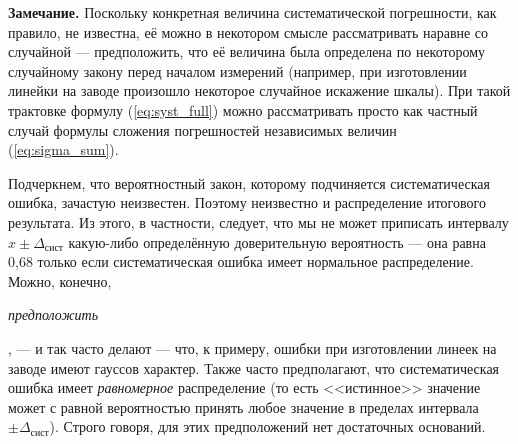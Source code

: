 \documentclass[10pt]{article}
\begin{document}
{\footnotesize
\textbf{Замечание.} Поскольку конкретная
величина систематической погрешности, как правило, не известна, её
можно в некотором смысле рассматривать наравне со случайной ---
предположить, что её величина была определена по некоторому случайному
закону перед началом измерений (например, при изготовлении линейки
на заводе произошло некоторое случайное искажение шкалы). При такой
трактовке формулу (\ref{eq:syst_full}) можно рассматривать просто
как частный случай формулы сложения погрешностей независимых величин
(\ref{eq:sigma_sum}).\par

Подчеркнем, что вероятностный закон, которому подчиняется
систематическая ошибка, зачастую неизвестен. Поэтому неизвестно и
распределение итогового результата. Из этого, в частности, следует,
что мы не может приписать интервалу $x\pm\Delta_{\text{сист}}$ какую-либо
определённую доверительную вероятность --- она равна 0,68
только если систематическая ошибка имеет нормальное распределение.
Можно, конечно, }\emph{\footnotesize{}предположить}{\footnotesize{},
--- и так часто делают --- что, к примеру, ошибки
при изготовлении линеек на заводе имеют гауссов характер. Также часто
предполагают, что систематическая ошибка имеет \emph{равномерное}
распределение (то есть <<истинное>> значение может с равной вероятностью 
принять любое значение в пределах интервала $\pm\Delta_{\text{сист}}$). 
Строго говоря, для этих предположений нет достаточных оснований.\par
}%
\end{document}
